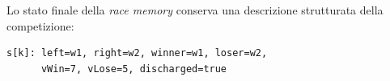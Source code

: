 Lo stato finale della \textit{race memory} conserva una descrizione strutturata della competizione:

\begin{tcolorbox}[colback=black!2,colframe=black!35,boxrule=0.4pt]
\begin{verbatim}
s[k]: left=w1, right=w2, winner=w1, loser=w2,
      vWin=7, vLose=5, discharged=true
\end{verbatim}
\end{tcolorbox}

